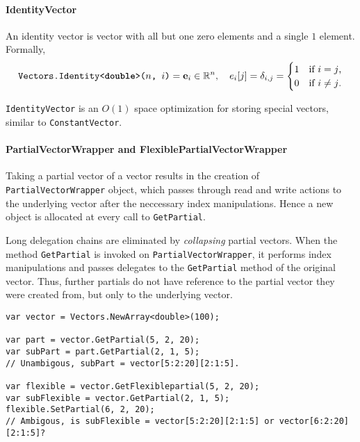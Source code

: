 \paragraph{IdentityVector}

An identity vector is vector with all but one zero elements and a
single $1$ element. Formally,
\begin{equation}
  \texttt{Vectors.Identity<\textbf{double}>($n$, $i$)} = \bm{\mathrm{e}}_i \in
  \mathbb{R}^n, \quad e_i[j] = \delta_{i, j} = \begin{cases}
    1 & \text{if $i = j$,} \\
    0 & \text{if $i \ne j$.}
  \end{cases}
\end{equation}

\texttt{IdentityVector} is an $O(1)$ space optimization for storing
special vectors, similar to \texttt{ConstantVector}.

\paragraph{PartialVectorWrapper and FlexiblePartialVectorWrapper}

Taking a partial vector of a vector results in the creation of
\texttt{PartialVectorWrapper} object, which passes through read and
write actions to the underlying vector after the neccessary index
manipulations. Hence a new object is allocated at every call to
\texttt{GetPartial}.

Long delegation chains are eliminated by \emph{collapsing} partial
vectors. When the method \texttt{GetPartial} is invoked on
\texttt{PartialVectorWrapper}, it performs index manipulations and
passes delegates to the \texttt{GetPartial} method of the original
vector. Thus, further partials do not have reference to the partial
vector they were created from, but only to the underlying vector.

\begin{lstlisting}[float,caption={Ambigous use of
    \texttt{FlexiblePartialVectorWrapper}.},label=lst:operations:ds:flexible-vector]
var vector = Vectors.NewArray<double>(100);

var part = vector.GetPartial(5, 2, 20);
var subPart = part.GetPartial(2, 1, 5);
// Unambigous, subPart = vector[5:2:20][2:1:5].

var flexible = vector.GetFlexiblepartial(5, 2, 20);
var subFlexible = vector.GetPartial(2, 1, 5);
flexible.SetPartial(6, 2, 20);
// Ambigous, is subFlexible = vector[5:2:20][2:1:5] or vector[6:2:20][2:1:5]?
\end{lstlisting}

